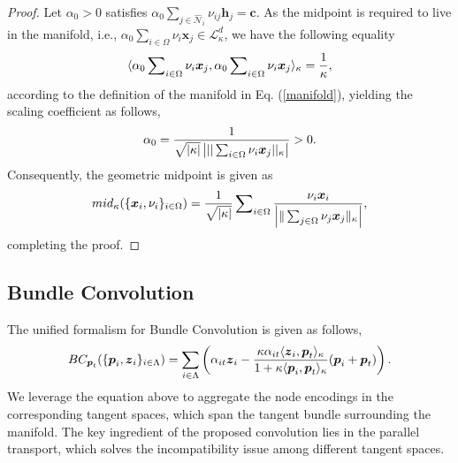 \begin{proof}
Let $\alpha_0 >0$ satisfies $\alpha_0 \sum\nolimits_{j \in \hat{\mathcal N}_i} \nu_{ij}\boldsymbol{h}_{j}= \boldsymbol{c}$. 
As the midpoint is required to live in the manifold, i.e., $\alpha_0 \sum\nolimits_{i \in \Omega} \nu_{i}\boldsymbol{x}_{j} \in  \mathcal L_{\kappa }^{d}$, 
we have the following equality
\vspace{-0.03in}
\begin{equation}
\langle \alpha_0 \sum\nolimits_{i \in \Omega} \nu_{i}\boldsymbol{x}_{j}, \alpha_0 \sum\nolimits_{i \in \Omega} \nu_{i}\boldsymbol{x}_{j}\rangle_\kappa = \frac{1}{\kappa},
\vspace{-0.01in}
\label{aggproof}
\end{equation}
according to the definition of the manifold in Eq. (\ref{manifold}), yielding the scaling coefficient as follows,
\vspace{-0.05in}
\begin{equation}
\alpha_0 =  \frac{1}{\sqrt{|\kappa|} \left| ||\sum\nolimits_{i \in \Omega} \nu_{i}\boldsymbol{x}_{j}||_\kappa \right|}>0.
\vspace{-0.03in}
\end{equation}
Consequently, the geometric midpoint is given as
\vspace{-0.03in}
\begin{equation}
mid_\kappa(\{\boldsymbol x_i, \nu_{i}\}_{i \in \Omega})= 
\frac{1}{\sqrt{|\kappa|} } \sum\nolimits_{i \in \Omega}\frac{\nu_{i} \boldsymbol x_i}{\left| \|\sum\nolimits_{j \in \Omega} \nu_{j} \boldsymbol x_j\|_\kappa \right|},
\vspace{-0.05in}
\end{equation}
completing the proof.
\end{proof}

\vspace{-0.1in}
\subsection{Bundle Convolution} 
The unified formalism for Bundle Convolution is given as follows,
\vspace{-0.05in}
\begin{align}
BC_{\boldsymbol p_t}(\{\boldsymbol p_i, \boldsymbol z_i\}_{i\in\Lambda})=\sum\limits_{i\in\Lambda}\left(\alpha_{it} \boldsymbol z_i-\frac{\kappa\alpha_{it}\langle\boldsymbol z_i, \boldsymbol p_t\rangle_\kappa}{1+\kappa\langle\boldsymbol p_i, \boldsymbol p_t\rangle_\kappa}(\boldsymbol p_i+\boldsymbol p_t)\right).
\label{eq:bconv2}
\vspace{-0.05in}
\end{align}
We leverage the equation above to aggregate the node encodings in the corresponding tangent spaces, which span the tangent bundle surrounding the manifold.
The key ingredient of the proposed convolution lies in the parallel transport, which solves the incompatibility issue among different tangent spaces.

